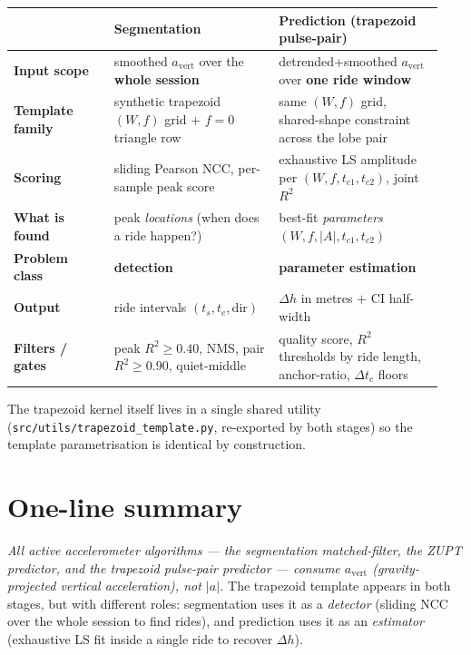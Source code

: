 \documentclass[11pt,a4paper]{article}
\newcommand{\avert}{a_{\mathrm{vert}}}
\newcommand{\amag}{\lvert a\rvert}
\begin{document}
\begin{table}[h]
\centering
\renewcommand{\arraystretch}{1.15}
\begin{tabular}{p{0.22\linewidth}p{0.36\linewidth}p{0.36\linewidth}}
\toprule
 & \textbf{Segmentation} & \textbf{Prediction (trapezoid pulse-pair)} \\
\midrule
\textbf{Input scope} & smoothed $\avert$ over the \textbf{whole session} & detrended+smoothed $\avert$ over \textbf{one ride window} \\
\textbf{Template family} & synthetic trapezoid $(W,f)$ grid $+$ $f{=}0$ triangle row & same $(W,f)$ grid, shared-shape constraint across the lobe pair \\
\textbf{Scoring} & sliding Pearson NCC, per-sample peak score & exhaustive LS amplitude per $(W,f,t_{c1},t_{c2})$, joint $R^2$ \\
\textbf{What is found} & peak \emph{locations} (when does a ride happen?) & best-fit \emph{parameters} $(W,f,|A|,t_{c1},t_{c2})$ \\
\textbf{Problem class} & \textbf{detection} & \textbf{parameter estimation} \\
\textbf{Output} & ride intervals $(t_s, t_e, \text{dir})$ & $\Delta h$ in metres $+$ CI half-width \\
\textbf{Filters / gates} & peak $R^2 \ge 0.40$, NMS, pair $R^2 \ge 0.90$, quiet-middle & quality score, $R^2$ thresholds by ride length, anchor-ratio, $\Delta t_c$ floors \\
\bottomrule
\end{tabular}
\end{table}

The trapezoid kernel itself lives in a single shared utility
(\texttt{src/utils/trapezoid\_template.py}, re-exported by both
stages) so the template parametrisation is identical by construction.

\section{One-line summary}

\textit{All active accelerometer algorithms --- the segmentation
matched-filter, the ZUPT predictor, and the trapezoid pulse-pair
predictor --- consume $\avert$ (gravity-projected vertical
acceleration), not $\amag$.} The trapezoid template appears in both
stages, but with different roles: segmentation uses it as a
\emph{detector} (sliding NCC over the whole session to find rides),
and prediction uses it as an \emph{estimator} (exhaustive LS fit
inside a single ride to recover $\Delta h$).
\end{document}
